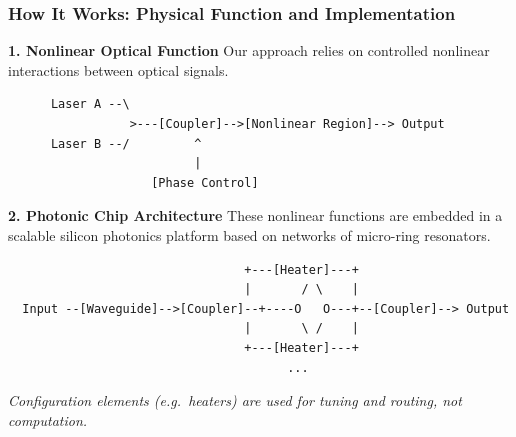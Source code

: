 \documentclass{beamer}
\begin{document}
\begin{frame}[fragile]
    \frametitle{How It Works: Physical Function and Implementation}

    \textbf{1. Nonlinear Optical Function}
        Our approach relies on controlled nonlinear interactions between optical signals.
    \begin{center}
    {\tiny
    \begin{verbatim}
      Laser A --\
                 >---[Coupler]-->[Nonlinear Region]--> Output
      Laser B --/         ^
                          |
                    [Phase Control]
    \end{verbatim}
    }
    \end{center}

    \vspace{0.4cm}

    \textbf{2. Photonic Chip Architecture}
        These nonlinear functions are embedded in a scalable silicon photonics platform
        based on networks of micro-ring resonators.
    \begin{center}
    {\tiny
    \begin{verbatim}
                                 +---[Heater]---+
                                 |       / \    |
  Input --[Waveguide]-->[Coupler]--+----O   O---+--[Coupler]--> Output
                                 |       \ /    |
                                 +---[Heater]---+
                                       ...
    \end{verbatim}
    }
    \end{center}

    \small
    \textit{Configuration elements (e.g.\ heaters) are used for tuning and routing, not computation.}
\end{frame}
\end{document}

